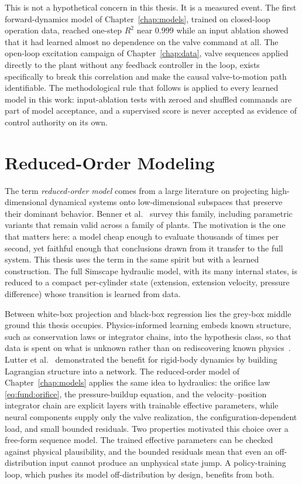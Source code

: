 This is not a hypothetical concern in this thesis. It is a measured
event. The first forward-dynamics model of Chapter~\ref{chap:models},
trained on closed-loop operation data, reached one-step $R^2$ near
$0.999$ while an input ablation showed that it had learned almost no
dependence on the valve command at all. The open-loop excitation
campaign of Chapter~\ref{chap:data}, valve sequences applied directly
to the plant without any feedback controller in the loop, exists
specifically to break this correlation and make the causal
valve-to-motion path identifiable. The methodological rule that follows is applied to every
learned model in this work: input-ablation tests with zeroed and
shuffled commands are part of model acceptance, and a supervised score
is never accepted as evidence of control authority on its own.

\section{Reduced-Order Modeling}
\label{sec:fund:rom}

The term \emph{reduced-order model} comes from a large literature on
projecting high-dimensional dynamical systems onto low-dimensional
subspaces that preserve their dominant behavior. Benner et
al.~\cite{benner2015survey} survey this family, including parametric
variants that remain valid across a family of plants. The motivation is
the one that matters here: a model cheap enough to evaluate thousands of
times per second, yet faithful enough that conclusions drawn from it
transfer to the full system. This thesis uses the term in the same
spirit but with a learned construction. The full Simscape hydraulic
model, with its many internal states, is reduced to a compact
per-cylinder state (extension, extension velocity, pressure difference)
whose transition is learned from data.

Between white-box projection and black-box regression lies the grey-box
middle ground this thesis occupies. Physics-informed learning embeds
known structure, such as conservation laws or integrator chains, into
the hypothesis class, so that data is spent on what is unknown
rather than on rediscovering known
physics~\cite{karniadakis2021physics}. Lutter et
al.~\cite{lutter2019deep} demonstrated the benefit for rigid-body
dynamics by building Lagrangian structure into a network. The
reduced-order model of Chapter~\ref{chap:models} applies the same idea
to hydraulics: the orifice law \eqref{eq:fund:orifice}, the
pressure-buildup equation, and the velocity--position integrator chain
are explicit layers with trainable effective parameters, while neural
components supply only the valve realization, the
configuration-dependent load, and small bounded residuals. Two
properties motivated this choice over a free-form sequence model. The
trained effective parameters can be checked against physical
plausibility, and the bounded residuals mean that even an
off-distribution input cannot produce an unphysical state jump. A
policy-training loop, which pushes its model off-distribution by design,
benefits from both.

